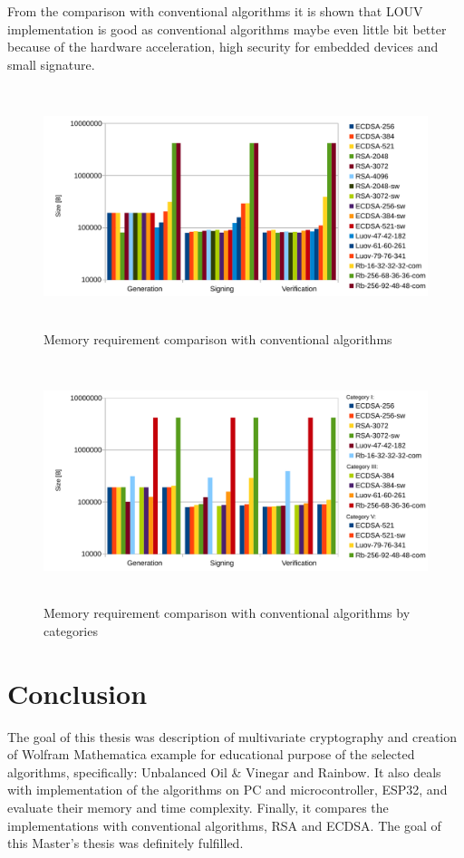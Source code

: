 \documentclass[thesis=M,english]{FITthesis}[2019/12/23]
\begin{document}
\bigskip
\noindent
From the comparison with conventional algorithms it is shown that LOUV implementation is good as conventional algorithms maybe even little bit better because of the hardware acceleration, high security for embedded devices and small signature.

\begin{figure}[H]
\centering
\includegraphics[width=13cm,height=7cm]{images/mem-all.pdf}
\caption{Memory requirement comparison with conventional algorithms}
\label{mem-all}
\end{figure}

\bigskip\bigskip\bigskip
\begin{figure}[H]
\centering
\includegraphics[width=13cm,height=7cm]{images/mem-category-all.pdf}
\caption{Memory requirement comparison with conventional algorithms by categories}
\label{mem-category-all}
\end{figure}

\chapter{Conclusion}
The goal of this thesis was description of multivariate cryptography and creation of Wolfram Mathematica example for educational purpose of the selected algorithms, specifically: Unbalanced Oil \& Vinegar and Rainbow. It also deals with implementation of the algorithms on PC and microcontroller, ESP32, and evaluate their memory and time complexity. Finally, it compares the implementations with conventional algorithms, RSA and ECDSA. The goal of this Master's thesis was definitely fulfilled.
\end{document}
